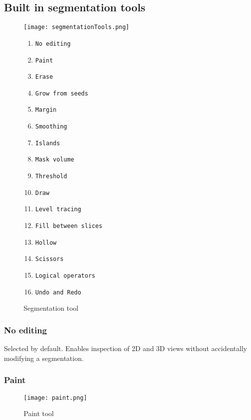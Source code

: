 \subsection{Built in segmentation tools}
\begin{figure}[h!]
	\begin{minipage}{0.6\textwidth}
		\begin{center}
			\texttt{[image: segmentationTools.png]}
			\caption{Segmentation tool}\label{fig:sT}
		\end{center}
	\end{minipage}%
	\begin{minipage}{0.6\textwidth}
		\begin{enumerate}
			\item \texttt{No editing}
			\item \texttt{Paint}
			\item \texttt{Erase}
			\item \texttt{Grow from seeds}
			\item \texttt{Margin}
			\item \texttt{Smoothing}
			\item \texttt{Islands}
			\item \texttt{Mask volume}
			\item \texttt{Threshold}
			\item \texttt{Draw}
			\item \texttt{Level tracing}
			\item \texttt{Fill between slices}
			\item \texttt{Hollow}
			\item \texttt{Scissors}
			\item \texttt{Logical operators}
			\item \texttt{Undo and Redo}
		\end{enumerate}
	\end{minipage}
\end{figure}

\subsubsection{No editing}
Selected by default. Enables inspection of 2D and 3D views without accidentally modifying a segmentation.
\pagebreak
\subsubsection{Paint}\label{section:paint}
\begin{figure}[h]
	\begin{subfigure}{0.2\textwidth}
		
	\end{subfigure}
	\begin{subfigure}{0.2\textwidth}
		
	\end{subfigure}
\end{figure}
\begin{figure}[h!]
	\centerline{
		\texttt{[image: paint.png]}}
	\caption{Paint tool}\label{fig:paint}
\end{figure}

